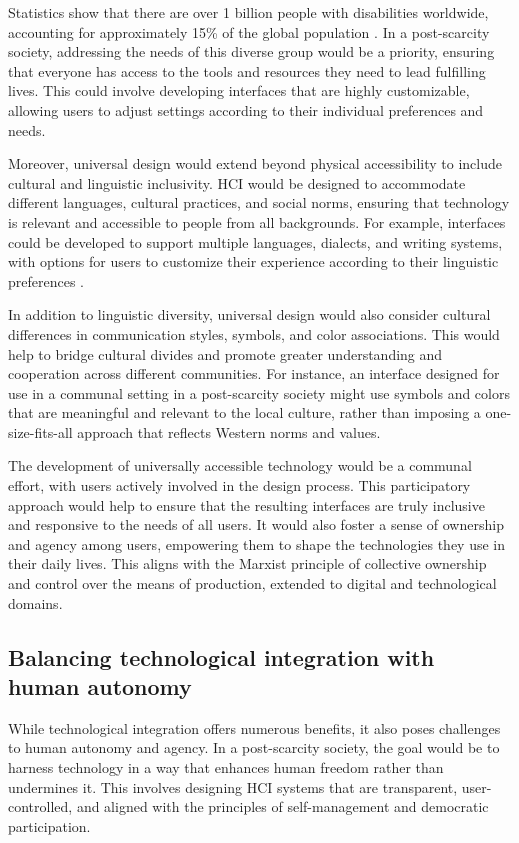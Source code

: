 Statistics show that there are over 1 billion people with disabilities worldwide, accounting for approximately 15\% of the global population \cite[pp.~203-205]{mies1986}. In a post-scarcity society, addressing the needs of this diverse group would be a priority, ensuring that everyone has access to the tools and resources they need to lead fulfilling lives. This could involve developing interfaces that are highly customizable, allowing users to adjust settings according to their individual preferences and needs.

Moreover, universal design would extend beyond physical accessibility to include cultural and linguistic inclusivity. HCI would be designed to accommodate different languages, cultural practices, and social norms, ensuring that technology is relevant and accessible to people from all backgrounds. For example, interfaces could be developed to support multiple languages, dialects, and writing systems, with options for users to customize their experience according to their linguistic preferences \cite[pp.~45-47]{gramsci1971}.

In addition to linguistic diversity, universal design would also consider cultural differences in communication styles, symbols, and color associations. This would help to bridge cultural divides and promote greater understanding and cooperation across different communities. For instance, an interface designed for use in a communal setting in a post-scarcity society might use symbols and colors that are meaningful and relevant to the local culture, rather than imposing a one-size-fits-all approach that reflects Western norms and values.

The development of universally accessible technology would be a communal effort, with users actively involved in the design process. This participatory approach would help to ensure that the resulting interfaces are truly inclusive and responsive to the needs of all users. It would also foster a sense of ownership and agency among users, empowering them to shape the technologies they use in their daily lives. This aligns with the Marxist principle of collective ownership and control over the means of production, extended to digital and technological domains.

\subsection{Balancing technological integration with human autonomy}

While technological integration offers numerous benefits, it also poses challenges to human autonomy and agency. In a post-scarcity society, the goal would be to harness technology in a way that enhances human freedom rather than undermines it. This involves designing HCI systems that are transparent, user-controlled, and aligned with the principles of self-management and democratic participation.


